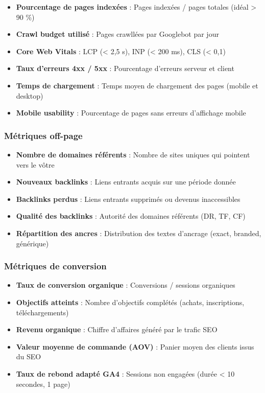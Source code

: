 \documentclass[12pt,a4paper,twoside]{report}
\begin{document}
\begin{itemize}
    \item \textbf{Pourcentage de pages indexées} : Pages indexées / pages totales (idéal > 90 \%)
    \item \textbf{Crawl budget utilisé} : Pages crawllées par Googlebot par jour
    \item \textbf{Core Web Vitals} : LCP (< 2,5 s), INP (< 200 ms), CLS (< 0,1)
    \item \textbf{Taux d'erreurs 4xx / 5xx} : Pourcentage d'erreurs serveur et client
    \item \textbf{Temps de chargement} : Temps moyen de chargement des pages (mobile et desktop)
    \item \textbf{Mobile usability} : Pourcentage de pages sans erreurs d'affichage mobile
\end{itemize}

\subsubsection{Métriques off-page}

\begin{itemize}
    \item \textbf{Nombre de domaines référents} : Nombre de sites uniques qui pointent vers le vôtre
    \item \textbf{Nouveaux backlinks} : Liens entrants acquis sur une période donnée
    \item \textbf{Backlinks perdus} : Liens entrants supprimés ou devenus inaccessibles
    \item \textbf{Qualité des backlinks} : Autorité des domaines référents (DR, TF, CF)
    \item \textbf{Répartition des ancres} : Distribution des textes d'ancrage (exact, branded, générique)
\end{itemize}

\subsubsection{Métriques de conversion}

\begin{itemize}
    \item \textbf{Taux de conversion organique} : Conversions / sessions organiques
    \item \textbf{Objectifs atteints} : Nombre d'objectifs complétés (achats, inscriptions, téléchargements)
    \item \textbf{Revenu organique} : Chiffre d'affaires généré par le trafic SEO
    \item \textbf{Valeur moyenne de commande (AOV)} : Panier moyen des clients issus du SEO
    \item \textbf{Taux de rebond adapté GA4} : Sessions non engagées (durée < 10 secondes, 1 page)
\end{itemize}
\end{document}
